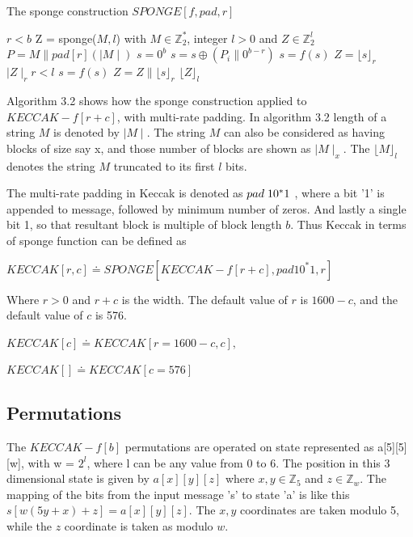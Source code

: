   \begin{algorithm}
    \caption{The sponge construction $SPONGE[f, pad, r]$\cite{00016}}
    \begin{algorithmic}[1]
      \Require $r < b$
       Z = sponge($M, l$) with $M \in \mathbb{Z}^{*}_{2}$, integer $ l > 0$ and $Z \in \mathbb{Z}^{l}_{2}$
      \State $P = M \parallel pad[r](\mid M \mid)$
      \State $s = 0^{b}$
      \State {}
        \State $s = s \oplus ( P_{i} \parallel 0^{b - r})$
        \State $s = f(s)$
      \State \EndFor
      \State $ Z = \lfloor s \rfloor_{r}$
      \State \While $\mid Z \mid_{r} r < l $
        \State $s = f(s)$
        \State $Z = Z \parallel \lfloor s \rfloor_{r}$
      \State \EndWhile
      \State \Return $\lfloor Z \rfloor_{l}$ 
    \end{algorithmic}
  \end{algorithm}

  Algorithm 3.2 shows how the sponge construction applied to $KECCAK-f[r + c]$, with multi-rate padding. In algorithm 3.2
  length of a string $M$ is denoted by $\mid M \mid $. The string $M$ can also be considered as having blocks of size say x,
  and those number of blocks are shown as $\mid M \mid_{x}$. The $\lfloor M \rfloor_{l}$ denotes the string $M$ truncated to its first $l$ bits.
  
  The multi-rate padding in Keccak is denoted as $pad \thickspace 1 0^{*}1$ , where a bit '1' is appended to message, followed 
  by minimum number of zeros. And lastly a single bit 1, so that resultant block is multiple of block length $b$. Thus 
  Keccak in terms of sponge function can be defined as 
  \begin{center}$KECCAK[r, c] \doteq SPONGE[KECCAK-f[r + c], pad1 0^{*}1, r]$ \end{center}
  Where $ r > 0$ and $r + c$ is the width. The default value of $r$ is $1600 - c$, and the default value of $c$ is 576.
  \begin{center}$KECCAK[c] \doteq KECCAK[r = 1600 - c, c],$\end{center}
  \begin{center}$KECCAK[] \doteq KECCAK[c = 576]$\end{center}
    
  \subsection{Permutations}

  The $KECCAK-f[b]$ permutations are operated on state represented as a[5][5][w], with w = $2^{l}$, where l can be any value
  from 0 to 6. The position in this 3 dimensional state is given by $a[x][y][z]$ where $x, y \in \mathbb{Z}_{5}$ and $z \in 
  \mathbb{Z}_{w}$. The mapping of the bits from the input message 's' to state 'a' is like this $s[w (5y + x) + z] = a[x][y][z]$.
  The $x, y$ coordinates are taken modulo 5, while the $z$ coordinate is taken as modulo $w$.  \cite{00015}

